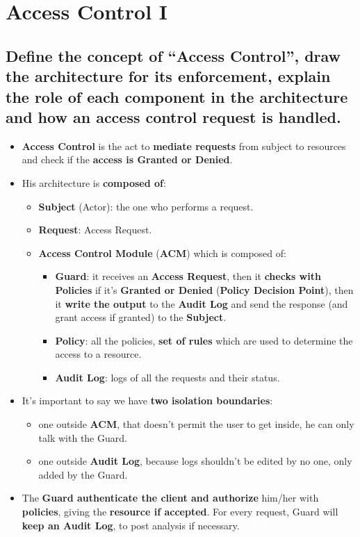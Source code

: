 \documentclass[9pt, letterpaper]{article}
\begin{document}
\section{Access Control I}

\subsection{Define the concept of “Access Control”, draw the architecture for its enforcement, explain the role of each component in the architecture and how an access control request is handled.}
\begin{itemize}
	\item \textbf{Access Control} is the act to \textbf{mediate requests} from subject to resources and check if the \textbf{access is Granted or Denied}.
	\item His architecture is \textbf{composed of}:
	\begin{itemize}
		\item \textbf{Subject} (Actor): the one who performs a request.
		\item \textbf{Request}: Access Request.
		\item \textbf{Access Control Module} (\textbf{ACM}) which is composed of:
		\begin{itemize}
			\item \textbf{Guard}: it receives an \textbf{Access Request}, then it \textbf{checks with Policies} if it's \textbf{Granted or Denied} (\textbf{Policy Decision Point}), then it \textbf{write the output} to the \textbf{Audit Log} and send the response (and grant access if granted) to the \textbf{Subject}.
			\item \textbf{Policy}: all the policies, \textbf{set of rules} which are used to determine the access to a resource.
			\item \textbf{Audit Log}: logs of all the requests and their status.
		\end{itemize}
	\end{itemize}
	\item It's important to say we have \textbf{two isolation boundaries}:
	\begin{itemize}
		\item one outside \textbf{ACM}, that doesn't permit the user to get inside, he can only talk with the Guard.
		\item one outside \textbf{Audit Log}, because logs shouldn't be edited by no one, only added by the Guard.
	\end{itemize}
	\item The \textbf{Guard authenticate the client and authorize} him/her with \textbf{policies}, giving the \textbf{resource if accepted}. For every request, Guard will \textbf{keep an Audit Log}, to post analysis if necessary.

\end{itemize}
\end{document}
